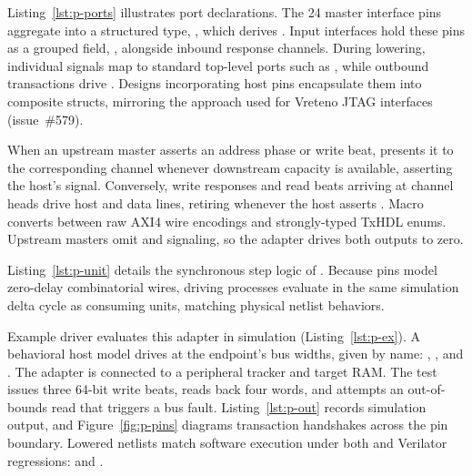 \documentclass[journal,9pt]{IEEEtran}
\newcommand{\pinspart}[3]{%
}
\begin{document}
\pinspart{ports}{The pins, as the unit's two sides.}{lst:p-ports}

Listing~\ref{lst:p-ports} illustrates  port declarations. The 24
master interface pins aggregate into a structured type, , which
derives . Input interfaces hold these pins as a grouped field,
, alongside inbound response channels. During lowering, individual
signals map to standard top-level ports such as , while
outbound transactions drive . Designs incorporating host pins
encapsulate them into composite structs, mirroring the approach used for Vreteno
JTAG interfaces (issue~\#579).

When an upstream master asserts an address phase or write beat, 
presents it to the corresponding channel whenever downstream capacity is
available, asserting the host's  signal. Conversely, write responses
and read beats arriving at channel heads drive host  and data lines,
retiring whenever the host asserts . Macro  converts
between raw AXI4 wire encodings and strongly-typed TxHDL enums. Upstream masters
omit  and  signaling, so the adapter drives both
outputs to zero.

\pinspart{unit}{\code{AxiPins}: the step.}{lst:p-unit}

Listing~\ref{lst:p-unit} details the synchronous step logic of .
Because pins model zero-delay combinatorial wires, driving processes evaluate in
the same simulation delta cycle as consuming units, matching physical netlist
behaviors.

Example driver  evaluates this adapter in simulation
(Listing~\ref{lst:p-ex}). A behavioral host model drives
 at the endpoint's bus widths, given by name:
, ,  and .
The adapter is connected to a
peripheral tracker and target RAM. The test issues three 64-bit write beats,
reads back four words, and attempts an out-of-bounds read that triggers a bus
fault. Listing~\ref{lst:p-out} records simulation output, and
Figure~\ref{fig:p-pins} diagrams transaction handshakes across the pin boundary.
Lowered netlists match software execution under both  and Verilator
regressions:  and
.


\end{document}

